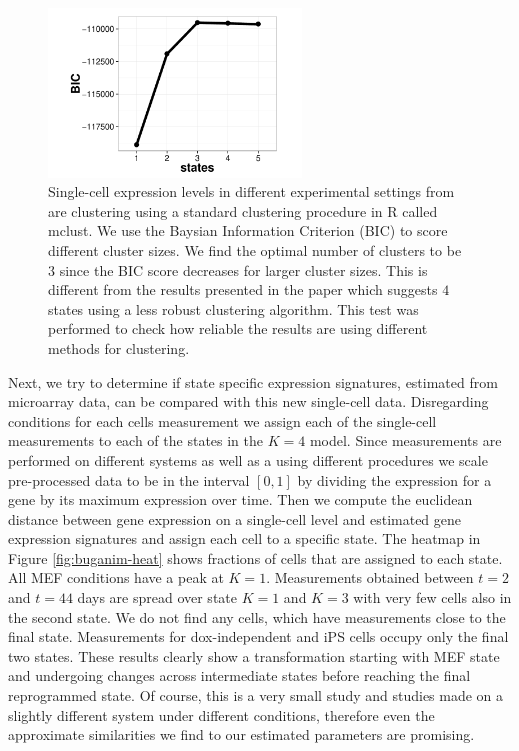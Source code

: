 \begin{figure}[!t]
  \centering
  \includegraphics[width=0.6\textwidth]{pics/yossi_mclust.pdf}
  \caption{Single-cell expression levels in different experimental settings from \cite{Buganim:2012hp} are clustering using a standard clustering procedure in R called mclust. We use the Baysian Information Criterion (BIC) to score different cluster sizes. We find the optimal number of clusters to be $3$ since the BIC score decreases for larger cluster sizes. This is different from the results presented in the paper which suggests $4$ states using a less robust clustering algorithm. This test was performed to check how reliable the results are using different methods for clustering. }
  \label{fig:buganim-mclust}
\end{figure}

Next, we try to determine if state specific expression signatures, estimated from microarray data, can be compared with this new single-cell data. Disregarding conditions for each cells measurement we assign each of the single-cell measurements to each of the states in the $K=4$ model. Since measurements are performed on different systems as well as a using different procedures we scale pre-processed data to be in the interval $[0, 1]$ by dividing the expression for a gene by its maximum expression over time. Then we compute the euclidean distance between gene expression on a single-cell level and estimated gene expression signatures and assign each cell to a specific state. The heatmap in Figure \ref{fig:buganim-heat} shows fractions of cells that are assigned to each state. All MEF conditions have a peak at $K=1$. Measurements obtained between $t=2$ and $t=44$ days are spread over state $K=1$ and $K=3$ with very few cells also in the second state. We do not find any cells, which have measurements close to the final state. Measurements for dox-independent and iPS cells occupy only the final two states. These results clearly show a transformation starting with MEF state and undergoing changes across intermediate states before reaching the final reprogrammed state. Of course, this is a very small study and studies made on a slightly different system under different conditions, therefore even the approximate similarities we find to our estimated parameters are promising.


